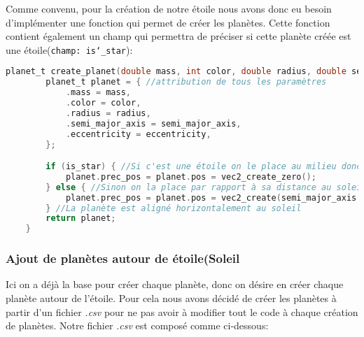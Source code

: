 \documentclass[a4paper,10pt]{article}
\begin{document}
    Comme convenu, pour la création de notre étoile nous avons donc eu besoin d'implémenter une fonction qui permet de créer les planètes.
    Cette fonction contient également un champ qui permettra de préciser si cette planète créée est une étoile(\texttt{champ: is\char`_star}):
    
    \begin{lstlisting}[language=c,label={lst:lstlisting2}]
        planet_t create_planet(double mass, int color, double radius, double semi_major_axis, double eccentricity, bool is_star) {
        planet_t planet = { //attribution de tous les paramètres
            .mass = mass,
            .color = color,
            .radius = radius,
            .semi_major_axis = semi_major_axis,
            .eccentricity = eccentricity,
        };

        if (is_star) { //Si c'est une étoile on le place au milieu donc vecteur 0
            planet.prec_pos = planet.pos = vec2_create_zero();
        } else { //Sinon on la place par rapport à sa distance au soleil(étoile) et son excentricité
            planet.prec_pos = planet.pos = vec2_create(semi_major_axis * (1 - eccentricity), 0);
        } //La planète est aligné horizontalement au soleil
        return planet;
    }
    \end{lstlisting}
    
    \subsubsection{Ajout de planètes autour de étoile(Soleil}

    Ici on a déjà la base pour créer chaque planète, donc on désire en créer chaque planète autour de l'étoile.
    Pour cela nous avons décidé de créer les planètes à partir d'un fichier \emph{.csv} pour ne pas avoir à modifier tout le code à chaque création de planètes.
    Notre fichier \emph{.csv} est composé comme ci-dessous:
\end{document}
